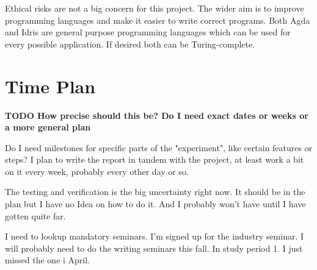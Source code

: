 \documentclass[parskip=half]{scrartcl}
\begin{document}
Ethical risks are not a big concern for this project. The wider aim is to
improve programming languages and make it easier to write correct programs.
Both Agda and Idris are general purpose programming languages which can be
used for every possible application. If desired both can be Turing-complete.



\section{Time Plan}
\textbf{TODO How precise should this be? Do I need exact dates or weeks or
a more general plan}


Do I need milestones for specific parts of the "experiment", like certain
features or steps? I plan to write the report in tandem with the project, at
least work a bit on it every week, probably every other day or so.

The testing and verification is the big uncertainty right now. It should be in
the plan but I have no Idea on how to do it. And I probably won't have until
I have gotten quite far.


I need to lookup mandatory seminars.
I'm signed up for the industry seminar.
I will probably need to do the writing seminars this fall. In study period 1.
I just missed the one i April.
\end{document}
